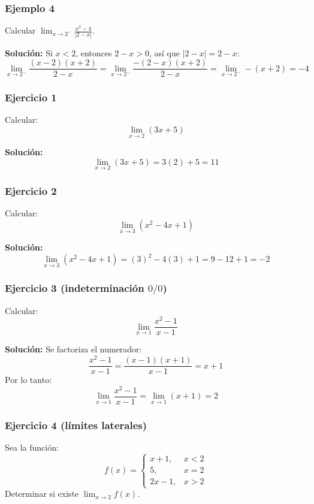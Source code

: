 \documentclass[12pt]{article}
\begin{document}
\subsubsection{Ejemplo 4}


Calcular $\displaystyle \lim_{x \to 2^-} \frac{x^2 - 4}{|2 - x|}$.

\textbf{Solución:} Si $x < 2$, entonces $2 - x > 0$, así que $|2 - x| = 2 - x$:
\[
\lim_{x \to 2^-} \frac{(x - 2)(x + 2)}{2 - x} = \lim_{x \to 2^-} \frac{-(2 - x)(x + 2)}{2 - x} = \lim_{x \to 2^-} -(x + 2) = -4
\]



\subsubsection{Ejercicio 1}


Calcular:
\[
\lim_{x \to 2} (3x + 5)
\]

\textbf{Solución:}
\[
\lim_{x \to 2} (3x + 5) = 3(2) + 5 = 11
\]



\subsubsection{Ejercicio 2}


Calcular:
\[
\lim_{x \to 3} (x^2 - 4x + 1)
\]

\textbf{Solución:}
\[
\lim_{x \to 3} (x^2 - 4x + 1) = (3)^2 - 4(3) + 1 = 9 - 12 + 1 = -2
\]



\subsubsection{Ejercicio 3 (indeterminación $0/0$)}


Calcular:
\[
\lim_{x \to 1} \frac{x^2 - 1}{x - 1}
\]

\textbf{Solución:}
Se factoriza el numerador:
\[
\frac{x^2 - 1}{x - 1} = \frac{(x-1)(x+1)}{x-1} = x + 1
\]
Por lo tanto:
\[
\lim_{x \to 1} \frac{x^2 - 1}{x - 1} = \lim_{x \to 1} (x+1) = 2
\]



\subsubsection{Ejercicio 4 (límites laterales)}


Sea la función:
\[
f(x) =
\begin{cases}
x + 1, & x < 2 \\
5, & x = 2 \\
2x - 1, & x > 2
\end{cases}
\]
Determinar si existe $\displaystyle \lim_{x \to 2} f(x)$.
\end{document}
